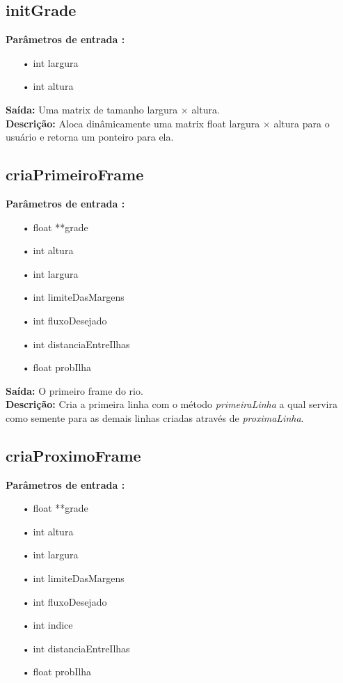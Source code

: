 \documentclass[a4paper,11pt]{article}
\begin{document}
\subsection{initGrade}\textbf{Parâmetros de entrada :}
\begin{enumerate}
\item[•]{int largura}
\item[•]{int altura}
\end{enumerate}

\textbf{Saída:} Uma matrix de tamanho largura $\times$ altura.\\

\textbf{Descrição:}
Aloca dinâmicamente uma matrix float largura $\times$ altura para o usuário e retorna um ponteiro para ela.

\subsection{criaPrimeiroFrame}
\textbf{Parâmetros de entrada :}
\begin{enumerate}
\item[•]{float **grade}
\item[•]{int altura}
\item[•]{int largura}
\item[•]{int limiteDasMargens}
\item[•]{int fluxoDesejado}
\item[•]{int distanciaEntreIlhas}
\item[•]{float probIlha}
\end{enumerate}

\textbf{Saída:} O primeiro frame do rio.\\

\textbf{Descrição:} Cria a primeira linha com o método \textit{primeiraLinha} a qual servira como semente para as demais linhas criadas através de \textit{proximaLinha}.

\subsection{criaProximoFrame}
\textbf{Parâmetros de entrada :}
\begin{enumerate}
\item[•]{float **grade}
\item[•]{int altura}
\item[•]{int largura}
\item[•]{int limiteDasMargens}
\item[•]{int fluxoDesejado}
\item[•]{int indice}
\item[•]{int distanciaEntreIlhas}
\item[•]{float probIlha}
\end{enumerate}
\end{document}
